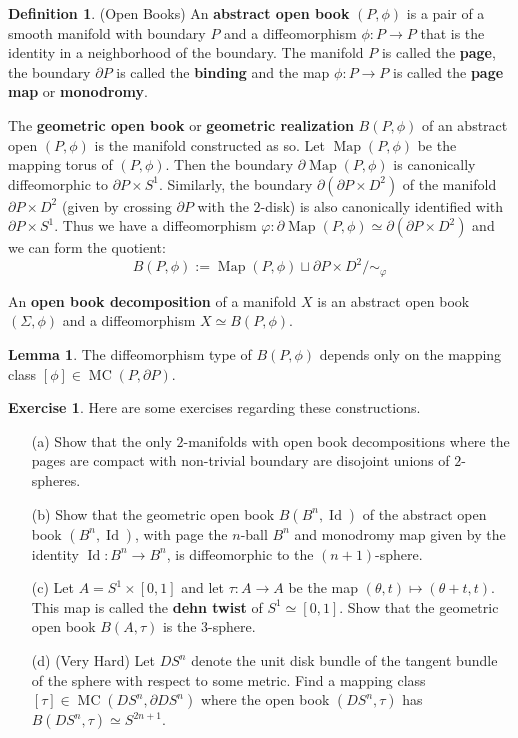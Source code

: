 \documentclass[12pt]{article}
\theoremstyle{definition}
\newtheorem{definition}[theorem]{Definition}
\newtheorem{exercise}[theorem]{Exercise}
\numberwithin{equation}{section}
\newtheorem{lemma}[theorem]{Lemma}
\newcommand{\op}{\operatorname}
\begin{document}
\begin{definition} (Open Books) An {\bf abstract open book} $(P,\phi)$ is a pair of a smooth manifold with boundary $P$ and a diffeomorphism $\phi:P \to P$ that is the identity in a neighborhood of the boundary. The manifold $P$ is called the {\bf page}, the boundary $\partial P$ is called the {\bf binding} and the map $\phi:P \to P$ is called the {\bf page map} or {\bf monodromy}.

The {\bf geometric open book} or {\bf geometric realization} $B(P,\phi)$ of an abstract open $(P,\phi)$ is the manifold constructed as so. Let $\op{Map}(P,\phi)$ be the mapping torus of $(P,\phi)$. Then the boundary $\partial \op{Map}(P,\phi)$ is canonically diffeomorphic to $\partial P \times S^1$. Similarly, the boundary $\partial (\partial P \times D^2)$ of the manifold $\partial P \times D^2$ (given by crossing $\partial P$ with the $2$-disk) is also canonically identified with $\partial P \times S^1$. Thus we have a diffeomorphism $\varphi:\partial \op{Map}(P,\phi) \simeq \partial (\partial P \times D^2)$ and we can form the quotient:
\[
B(P,\phi) := \op{Map}(P,\phi) \sqcup \partial P \times D^2 /\sim_{\varphi}
\]

An {\bf open book decomposition} of a manifold $X$ is an abstract open book $(\Sigma,\phi)$ and a diffeomorphism $X \simeq B(P,\phi)$.
\end{definition}

\begin{lemma} The diffeomorphism type of $B(P,\phi)$ depends only on the mapping class $[\phi] \in \op{MC}(P,\partial P)$.
\end{lemma}

\begin{exercise} Here are some exercises regarding these constructions.
\begin{itemize}
	\item[(a)] Show that the only $2$-manifolds with open book decompositions where the pages are compact with non-trivial boundary are disojoint unions of $2$-spheres.
	\item[(b)] Show that the geometric open book $B(B^n,\op{Id})$ of the abstract open book $(B^n,\op{Id})$, with page the $n$-ball $B^n$ and monodromy map given by the identity $\op{Id}:B^n \to B^n$, is diffeomorphic to the $(n+1)$-sphere.
	\item[(c)] Let $A = S^1 \times [0,1]$ and let $\tau:A \to A$ be the map $(\theta,t) \mapsto (\theta + t,t)$. This map is called the {\bf dehn twist} of $S^1 \simeq [0,1]$. Show that the geometric open book $B(A,\tau)$ is the $3$-sphere.
	\item[(d)] (Very Hard) Let $DS^n$ denote the unit disk bundle of the tangent bundle of the sphere with respect to some metric. Find a mapping class $[\tau] \in \op{MC}(DS^n,\partial DS^n)$ where the open book $(DS^n,\tau)$ has $B(DS^n,\tau) \simeq S^{2n+1}$.
\end{itemize}
\end{exercise} 
\end{document}
